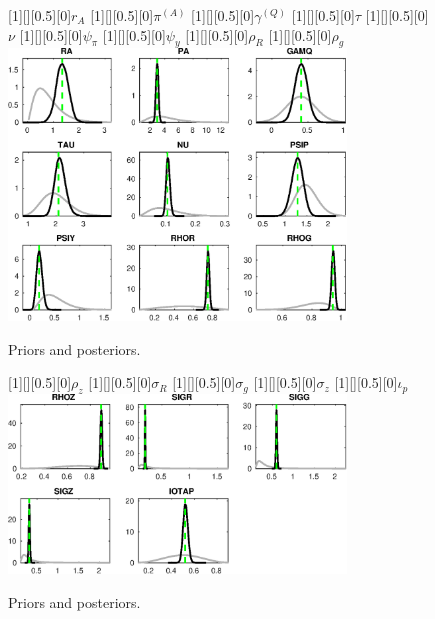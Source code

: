  
\begin{figure}[H]
[1][][0.5][0]{$ {r_{A}} $}
[1][][0.5][0]{$ {\pi^{(A)}} $}
[1][][0.5][0]{$ {\gamma^{(Q)}} $}
[1][][0.5][0]{$ {\tau} $}
[1][][0.5][0]{$ {\nu} $}
[1][][0.5][0]{$ {\psi_\pi} $}
[1][][0.5][0]{$ {\psi_y} $}
[1][][0.5][0]{$ {\rho_R} $}
[1][][0.5][0]{$ {\rho_{g}} $}
\centering
\includegraphics[width=0.80\textwidth]{AnSchoModTheBuilder/Output/AnSchoModTheBuilder_PriorsAndPosteriors1}
\caption{Priors and posteriors.}\label{Fig:PriorsAndPosteriors:1}
\end{figure}
 
\begin{figure}[H]
[1][][0.5][0]{$ {\rho_z} $}
[1][][0.5][0]{$ {\sigma_R} $}
[1][][0.5][0]{$ {\sigma_{g}} $}
[1][][0.5][0]{$ {\sigma_z} $}
[1][][0.5][0]{$ {\iota_p} $}
\centering
\includegraphics[width=0.80\textwidth]{AnSchoModTheBuilder/Output/AnSchoModTheBuilder_PriorsAndPosteriors2}
\caption{Priors and posteriors.}\label{Fig:PriorsAndPosteriors:2}
\end{figure}
 

